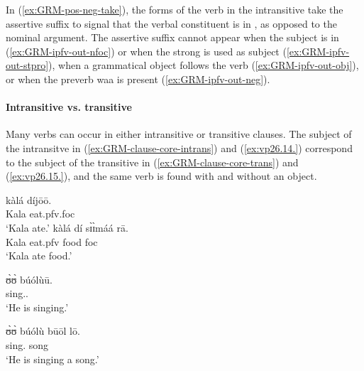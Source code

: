 \begin{exe}
\begin{exe}
\begin{exe}
\begin{exe}
\begin{exe}
\begin{exe}
\begin{exe}
\begin{exe}
\begin{exe}
\begin{exe}
\begin{exe}
\z 
 \z

In (\ref{ex:GRM-pos-neg-take}), the forms of the verb in the
intransitive  take the assertive suffix to signal that the verbal
constituent is in , as opposed to the nominal argument. The 
assertive suffix cannot appear
when the subject is in  (\ref{ex:GRM-ipfv-out-nfoc}) or when the strong
 is used as subject (\ref{ex:GRM-ipfv-out-stpro}), when a grammatical
object follows the verb  (\ref{ex:GRM-ipfv-out-obj}), or when the 
preverb {\sls waa} is present  (\ref{ex:GRM-ipfv-out-neg}).



\paragraph{Intransitive vs. transitive}
\label{sec:GRM-trans-intran}


Many verbs can occur in either  intransitive or transitive clauses. The subject 
of the intransitve  in (\ref{ex:GRM-clause-core-intrans}) and 
(\ref{ex:vp26.14.}) correspond to the subject of the transitive  in  
(\ref{ex:GRM-clause-core-trans}) and (\ref{ex:vp26.15.}), and the same verb is 
found with and without an object.


\ea\label{ex:GRM-clause-core}


 \ea\label{ex:GRM-clause-core-intrans}
\gll kàlá díjōō.\\
 Kala eat.{\sc pfv.foc}\\
\glt  `Kala {\sc ate}.' 
\ex\label{ex:GRM-clause-core-trans}
\gll kàlá dí sɪ̀ɪ̀máá rā.\\
Kala eat.{\sc pfv}  food {\sc foc}\\
\glt  `Kala ate {\sc food}.' 



\ex\label{ex:vp26.14.}
\gll ʊ̀ʊ̀ búólùū.\\
    {\psg} sing.{\ipfv.\foc}\\
\glt  `He is {\sc singing}.' 

\ex\label{ex:vp26.15.}
\gll  ʊ̀ʊ̀ búólù būōl lō.\\
    {\psg}  sing.{\ipfv} song {\foc}\\
\glt  `He is singing a {\sc song}.' 

\z
 \z



\end{exe}
\end{exe}
\end{exe}
\end{exe}
\end{exe}
\end{exe}
\end{exe}
\end{exe}
\end{exe}
\end{exe}
\end{exe}
